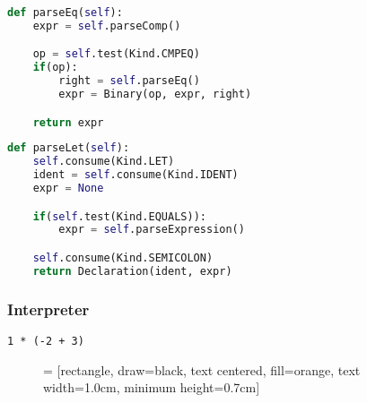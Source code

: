 \documentclass{beamer}
\begin{document}
    \begin{frame}[fragile]
    \begin{lstlisting}[language=Python]
def parseEq(self):
    expr = self.parseComp()

    op = self.test(Kind.CMPEQ)
    if(op):
        right = self.parseEq()
        expr = Binary(op, expr, right)

    return expr
    \end{lstlisting}
    \end{frame}

    \begin{frame}[fragile]
    \begin{lstlisting}[language=Python]
def parseLet(self):
    self.consume(Kind.LET)
    ident = self.consume(Kind.IDENT)
    expr = None

    if(self.test(Kind.EQUALS)):
        expr = self.parseExpression()

    self.consume(Kind.SEMICOLON)
    return Declaration(ident, expr)
    \end{lstlisting}
    \end{frame}

    \begin{frame}[fragile]
    \frametitle{Interpreter}
    \begin{lstlisting}[]
1 * (-2 + 3)
    \end{lstlisting}
    \begin{figure}
     = [rectangle, draw=black, text centered, fill=orange, text width=1.0cm, minimum height=0.7cm]
    \end{figure}
    \end{frame}
\end{document}
